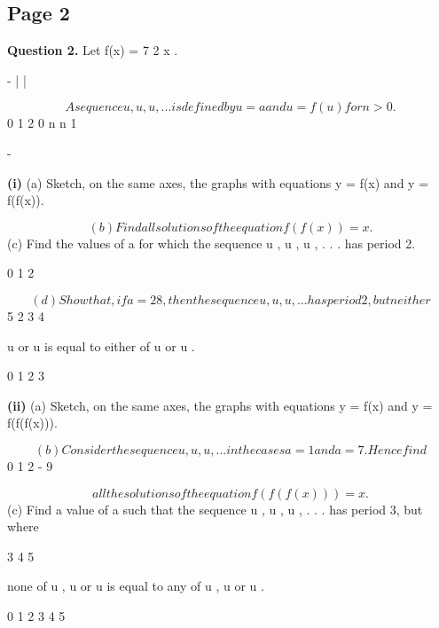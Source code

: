\documentclass[12pt]{article}
\begin{document}
\subsection*{Page 2}
\begin{flushleft}
\bigskip\textbf{Question 2.} Let f(x) = 7 2 x .\par
- | |\par
\[A sequence u , u , u , . . . is defined by u = a and u = f(u ) for n > 0.\]
0 1 2 0 n n 1\par
-\par
\textbf{(i)} (a) Sketch, on the same axes, the graphs with equations y = f(x) and y = f(f(x)).\par
\[(b) Find all solutions of the equation f(f(x)) = x.\]
(c) Find the values of a for which the sequence u , u , u , . . . has period 2.\par
0 1 2\par
\[(d) Show that, if a = 28 , then the sequence u , u , u , . . . has period 2, but neither\]
5 2 3 4\par
u or u is equal to either of u or u .\par
0 1 2 3\par
\textbf{(ii)} (a) Sketch, on the same axes, the graphs with equations y = f(x) and y = f(f(f(x))).\par
\[(b) Consider the sequence u , u , u , . . . in the cases a = 1 and a = 7 . Hence find\]
0 1 2 - 9\par
\[all the solutions of the equation f(f(f(x))) = x.\]
(c) Find a value of a such that the sequence u , u , u , . . . has period 3, but where\par
3 4 5\par
none of u , u or u is equal to any of u , u or u .\par
0 1 2 3 4 5\par
\end{flushleft}
\end{document}
